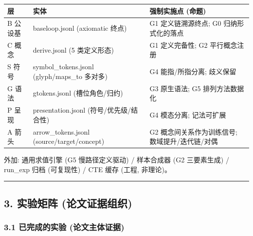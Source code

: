 \documentclass[
]{article}
\begin{document}
\begin{longtable}[]{@{}
  >{\raggedright\arraybackslash}p{}
  >{\raggedright\arraybackslash}p{}
  >{\raggedright\arraybackslash}p{}@{}}
\toprule\noalign{}
\begin{minipage}[b]{\linewidth}\raggedright
层
\end{minipage} & \begin{minipage}[b]{\linewidth}\raggedright
实体
\end{minipage} & \begin{minipage}[b]{\linewidth}\raggedright
强制实施点 (命题)
\end{minipage} \\
\midrule\noalign{}
\endhead
\bottomrule\noalign{}
\endlastfoot
B 公设基 & baseloop.jsonl (axiomatic 终点) & G1 定义链溯源终点; G0
归纳形式化的落点 \\
C 概念 & derive.jsonl (5 类定义形态) & G1 定义完备性; G2 平行概念注册 \\
S 符号 & symbol\_tokens.jsonl (glyph/maps\_to 多对多) & G4
能指/所指分离; 歧义保留 \\
G 语法 & gtokens.jsonl (槽位角色/归约) & G3 原生语法; G5
排列方法数据化 \\
P 呈现 & presentation.jsonl (符号/优先级/结合性) & G4 模态分离;
记法可扩展 \\
A 箭头 & arrow\_tokens.jsonl (source/target/concept) & G2
概念间关系作为训练信号; 数域提升/迭代链/对偶 \\
\end{longtable}

外加: 通用求值引擎 (G5 慢路径定义驱动) / 样本合成器 (G2 三要素生成) /
run\_exp 归档 (可复现性) / CTE 缓存 (工程, 非理论)。

\begin{center}\rule{0.5\linewidth}{0.5pt}\end{center}

\subsection{3. 实验矩阵
(论文证据组织)}\label{ux5b9eux9a8cux77e9ux9635-ux8bbaux6587ux8bc1ux636eux7ec4ux7ec7}

\subsubsection{3.1 已完成的实验
(论文主体证据)}\label{ux5df2ux5b8cux6210ux7684ux5b9eux9a8c-ux8bbaux6587ux4e3bux4f53ux8bc1ux636e}
\end{document}
